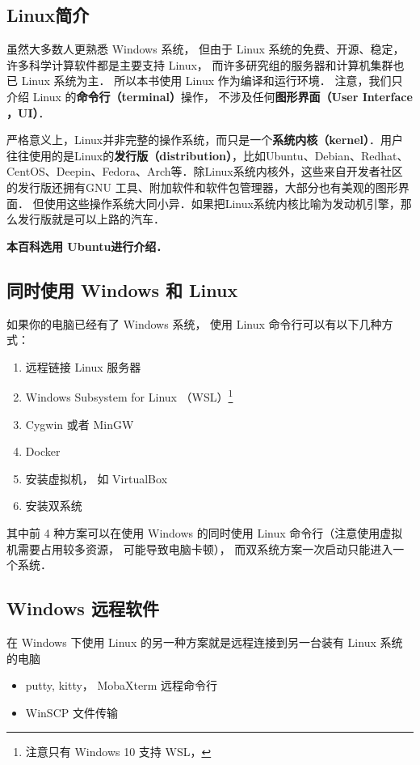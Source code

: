 
\begin{issues}
\issueTODO
\end{issues}

\subsection{Linux简介}
虽然大多数人更熟悉 Windows 系统， 但由于 Linux 系统的免费、开源、稳定， 许多科学计算软件都是主要支持 Linux， 而许多研究组的服务器和计算机集群也已 Linux 系统为主． 所以本书使用 Linux 作为编译和运行环境． 注意，我们只介绍 Linux 的\textbf{命令行（terminal）}操作， 不涉及任何\textbf{图形界面（User Interface ，UI）}． 

严格意义上，Linux并非完整的操作系统，而只是一个\textbf{系统内核（kernel）}．用户往往使用的是Linux的\textbf{发行版（distribution）}，比如Ubuntu、Debian、Redhat、CentOS、Deepin、Fedora、Arch等．除Linux系统内核外，这些来自开发者社区的发行版还拥有GNU 工具、附加软件和软件包管理器，大部分也有美观的图形界面． 但使用这些操作系统大同小异．如果把Linux系统内核比喻为发动机引擎，那么发行版就是可以上路的汽车．

\textbf{本百科选用 Ubuntu进行介绍．}


\subsection{同时使用 Windows 和 Linux}
如果你的电脑已经有了 Windows 系统， 使用 Linux 命令行可以有以下几种方式：
\begin{enumerate}
\item 远程链接 Linux 服务器
\item Windows Subsystem for Linux （WSL）\footnote{注意只有 Windows 10 支持 WSL，} 
\item Cygwin 或者 MinGW
\item Docker
\item 安装虚拟机， 如 VirtualBox
\item 安装双系统
\end{enumerate}
其中前 4 种方案可以在使用 Windows 的同时使用 Linux 命令行（注意使用虚拟机需要占用较多资源， 可能导致电脑卡顿）， 而双系统方案一次启动只能进入一个系统．

\subsection{Windows 远程软件}
在 Windows 下使用 Linux 的另一种方案就是远程连接到另一台装有 Linux 系统的电脑
\begin{itemize}
\item putty, kitty， MobaXterm 远程命令行
\item WinSCP 文件传输
\end{itemize}

